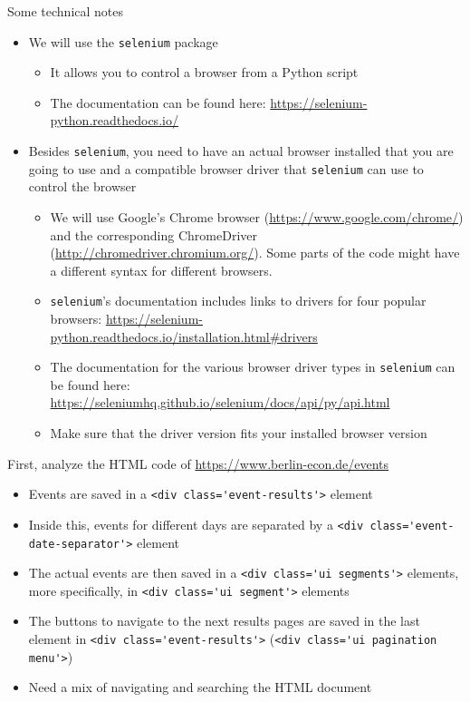 \begin{frame}[fragile]{Some technical notes}
\begin{itemize}
	\item We will use the \verb!selenium! package
	\begin{itemize}
		\item It allows you to control a browser from a Python script
		\item The documentation can be found here: \url{https://selenium-python.readthedocs.io/}
	\end{itemize}
	\item Besides \verb!selenium!, you need to have an actual browser installed that you are going to use and a compatible browser driver that \verb!selenium! can use to control the browser
	\begin{itemize}
		\item We will use Google's Chrome browser (\url{https://www.google.com/chrome/}) and the corresponding ChromeDriver (\url{http://chromedriver.chromium.org/}). Some parts of the code might have a different syntax for different browsers.
		\item \verb!selenium!'s documentation includes links to drivers for four popular browsers: \url{https://selenium-python.readthedocs.io/installation.html#drivers}
		\item The documentation for the various browser driver types in \verb!selenium! can be found here: \url{https://seleniumhq.github.io/selenium/docs/api/py/api.html}
		\item Make sure that the driver version fits your installed browser version
	\end{itemize}
\end{itemize}
\end{frame}

\begin{frame}[fragile]{First, analyze the HTML code of \url{https://www.berlin-econ.de/events}}
\begin{itemize}
	\item Events are saved in a \verb!<div class='event-results'>! element
	\item Inside this, events for different days are separated by a \verb!<div class='event-date-separator'>! element
	\item The actual events are then saved in a \verb!<div class='ui segments'>! elements, more specifically, in \verb!<div class='ui segment'>! elements
	\item The buttons to navigate to the next results pages are saved in the last element in \verb!<div class='event-results'>! (\verb!<div class='ui pagination menu'>!)
	\item Need a mix of navigating and searching the HTML document
\end{itemize}
\end{frame}

